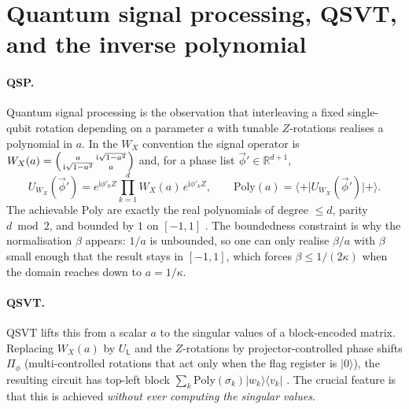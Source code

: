 \documentclass[11pt,a4paper]{article}
\theoremstyle{plain}
\theoremstyle{definition}
\theoremstyle{remark}
\newcommand{\R}{\mathbb{R}}
\newcommand{\ket}[1]{\lvert #1 \rangle}
\newcommand{\bra}[1]{\langle #1 \rvert}
\newcommand{\ii}{\mathrm{i}}
\newcommand{\Lmat}{\mathsf{L}}
\begin{document}
\section{Quantum signal processing, QSVT, and the inverse polynomial}
\label{app:qsvt}

\paragraph{QSP.}  Quantum signal processing is the observation that
interleaving a fixed single-qubit rotation depending on a parameter $a$ with
tunable $Z$-rotations realises a polynomial in $a$.  In the $W_X$ convention
\cite[Appendix A.1]{Setty2026} the signal operator is
$W_X(a)=\begin{psmallmatrix}a&\ii\sqrt{1-a^2}\\ \ii\sqrt{1-a^2}&a\end{psmallmatrix}$
and, for a phase list $\vec\phi'\in\R^{d+1}$,
\begin{equation}
U_{W_X}(\vec\phi')=e^{\ii\phi'_0Z}\prod_{k=1}^{d}W_X(a)\,e^{\ii\phi'_kZ},
\qquad
\mathrm{Poly}(a)=\bra{+}U_{W_X}(\vec\phi')\ket{+}.
\end{equation}
The achievable $\mathrm{Poly}$ are exactly the real polynomials of degree
$\le d$, parity $d\bmod2$, and bounded by $1$ on $[-1,1]$
\cite[Theorem~1]{Setty2026}.  The boundedness constraint is why the
normalisation $\beta$ appears: $1/a$ is unbounded, so one can only realise
$\beta/a$ with $\beta$ small enough that the result stays in $[-1,1]$, which
forces $\beta\le1/(2\kappa)$ when the domain reaches down to $a=1/\kappa$.

\paragraph{QSVT.}  QSVT lifts this from a scalar $a$ to the singular values of a
block-encoded matrix.  Replacing $W_X(a)$ by $U_{\Lmat}$ and the $Z$-rotations by
projector-controlled phase shifts $\Pi_{\phi}$ (multi-controlled rotations that
act only when the flag register is $\ket{0}$), the resulting circuit has
top-left block $\sum_k\mathrm{Poly}(\sigma_k)\ket{w_k}\!\bra{v_k}$
\cite[Theorem~2]{Setty2026}.  The crucial feature is that this is achieved
\emph{without ever computing the singular values}.
\end{document}
